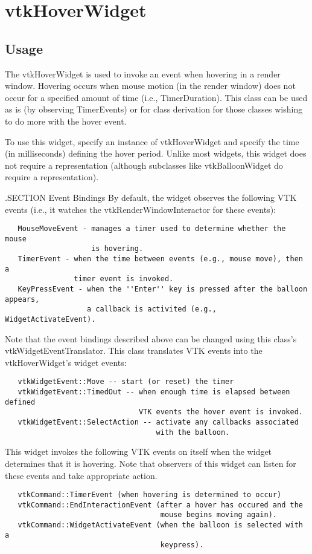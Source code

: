 \section{vtkHoverWidget}

\subsection{Usage}

 The vtkHoverWidget is used to invoke an event when hovering in a render window.
 Hovering occurs when mouse motion (in the render window) does not occur
 for a specified amount of time (i.e., TimerDuration). This class can be used
 as is (by observing TimerEvents) or for class derivation for those classes
 wishing to do more with the hover event.
 
 To use this widget, specify an instance of vtkHoverWidget and specify the
 time (in milliseconds) defining the hover period. Unlike most widgets,
 this widget does not require a representation (although subclasses like
 vtkBalloonWidget do require a representation).

 .SECTION Event Bindings
 By default, the widget observes the following VTK events (i.e., it
 watches the vtkRenderWindowInteractor for these events):
 \begin{verbatim}
   MouseMoveEvent - manages a timer used to determine whether the mouse
                    is hovering.
   TimerEvent - when the time between events (e.g., mouse move), then a
                timer event is invoked.
   KeyPressEvent - when the ''Enter'' key is pressed after the balloon appears,
                   a callback is activited (e.g., WidgetActivateEvent).
 \end{verbatim}

 Note that the event bindings described above can be changed using this
 class's vtkWidgetEventTranslator. This class translates VTK events 
 into the vtkHoverWidget's widget events:
 \begin{verbatim}
   vtkWidgetEvent::Move -- start (or reset) the timer
   vtkWidgetEvent::TimedOut -- when enough time is elapsed between defined
                               VTK events the hover event is invoked.
   vtkWidgetEvent::SelectAction -- activate any callbacks associated 
                                   with the balloon.
 \end{verbatim}

 This widget invokes the following VTK events on itself when the widget 
 determines that it is hovering. Note that observers of this widget can
 listen for these events and take appropriate action.
 \begin{verbatim}
   vtkCommand::TimerEvent (when hovering is determined to occur)
   vtkCommand::EndInteractionEvent (after a hover has occured and the
                                    mouse begins moving again).
   vtkCommand::WidgetActivateEvent (when the balloon is selected with a
                                    keypress).
 \end{verbatim}


